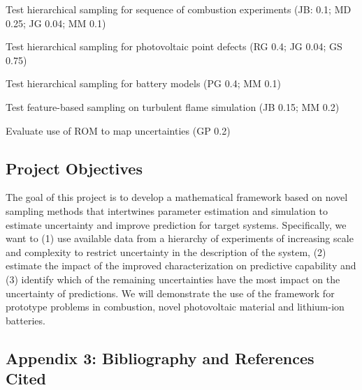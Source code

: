 \documentclass[11pt]{article}
\begin{document}
\begin{compactitem}
\setlength{\itemsep}{0pt}\setlength{\parskip}{0pt}\setlength{\parsep}{0pt}
\item Test hierarchical sampling for sequence of combustion experiments
(JB: 0.1; MD 0.25; JG 0.04; MM 0.1)
\item Test hierarchical sampling for photovoltaic point defects
(RG 0.4; JG 0.04; GS 0.75)
\item Test hierarchical sampling for battery models
(PG 0.4; MM 0.1)
\item Test feature-based sampling on turbulent flame simulation
(JB 0.15; MM 0.2)
\item Evaluate use of ROM to map uncertainties
(GP 0.2)
\end{compactitem}

\subsection*{Project Objectives}

The goal of this project is to develop a mathematical framework  
based on novel sampling methods that
intertwines parameter estimation and simulation 
to estimate uncertainty and improve prediction for target systems.
Specifically, we want to
(1) use available data from a hierarchy
of experiments of increasing scale and complexity to restrict
uncertainty in the description of the system, (2) estimate the impact of the improved characterization
on predictive capability and (3) identify which of the remaining uncertainties have the most impact
on the uncertainty of predictions.
We will demonstrate the use of the framework for prototype problems in combustion,
novel photovoltaic material and lithium-ion batteries.

%
%
%

\newpage
\subsection*{Appendix 3:  Bibliography and References Cited}

\end{document}
